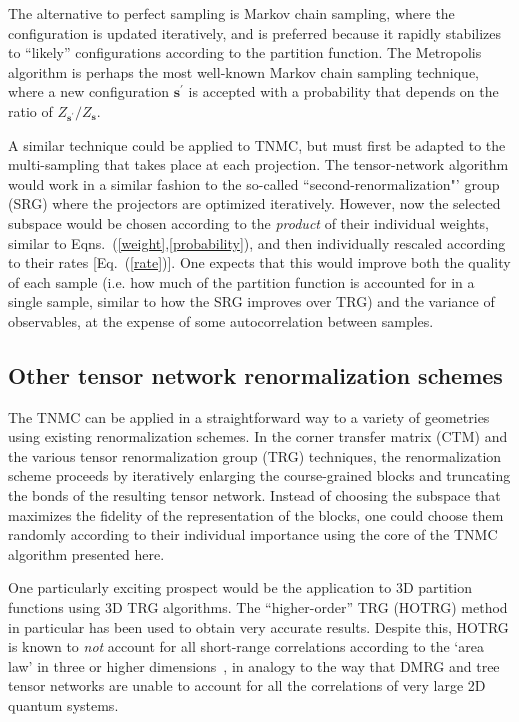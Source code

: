 \documentclass[aps,prl,nopacs,twocolumn]{revtex4}
\newcommand {\Eqn}[1] {Eq.~(\ref{#1})}
\begin{document}
The alternative to perfect sampling is Markov chain sampling, where the configuration is updated iteratively, and is preferred because it rapidly stabilizes to ``likely'' configurations according to the partition function. The Metropolis algorithm is perhaps the most well-known Markov chain sampling technique, where a new configuration $\mathbf{s}^\prime$ is accepted with a probability that depends on the ratio of $Z_{\mathbf{s}^\prime}/Z_{\mathbf{s}} $. 

A similar technique could be applied to TNMC, but must first be adapted to the multi-sampling that takes place at each projection. The tensor-network algorithm would work in a similar fashion to the so-called ``second-renormalization"' group (SRG) where the projectors are optimized iteratively. However, now the selected subspace would be chosen according to the \emph{product} of their individual weights, similar to Eqns.~(\ref{weight},\ref{probability}), and then individually rescaled according to their rates [\Eqn{rate}]. One expects that this would improve both the quality of each sample (i.e. how much of the partition function is accounted for in a single sample, similar to how the SRG improves over TRG) and the variance of observables, at the expense of some autocorrelation between samples.

\subsection{Other tensor network renormalization schemes}

The TNMC can be applied in a straightforward way to a variety of geometries using existing renormalization schemes. In the corner transfer matrix (CTM) and the various tensor renormalization group (TRG) techniques, the renormalization scheme proceeds by iteratively enlarging the course-grained blocks and truncating the bonds of the resulting tensor network. Instead of choosing the subspace that maximizes the fidelity of the representation of the blocks, one could choose them randomly according to their individual importance using the core of the TNMC algorithm presented here.

One particularly exciting prospect would be the application to 3D partition functions using 3D TRG algorithms. The ``higher-order'' TRG (HOTRG) method in particular has been used to obtain very accurate results. Despite this, HOTRG is known to \emph{not} account for all short-range correlations according to the `area law' in three or higher dimensions~\cite{Ferris2013}, in analogy to the way that DMRG and tree tensor networks are unable to account for all the correlations of very large 2D quantum systems.
\end{document}
